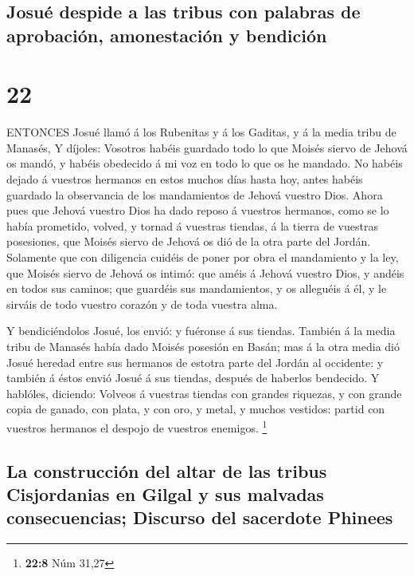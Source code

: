 \hypertarget{josuuxe9-despide-a-las-tribus-con-palabras-de-aprobaciuxf3n-amonestaciuxf3n-y-bendiciuxf3n}{%
\subsection{Josué despide a las tribus con palabras de aprobación,
amonestación y
bendición}\label{josuuxe9-despide-a-las-tribus-con-palabras-de-aprobaciuxf3n-amonestaciuxf3n-y-bendiciuxf3n}}

\hypertarget{section-21}{%
\section{22}\label{section-21}}

 ENTONCES Josué llamó á los Rubenitas y á los Gaditas, y á
la media tribu de Manasés,  Y díjoles: Vosotros habéis
guardado todo lo que Moisés siervo de Jehová os mandó, y habéis
obedecido á mi voz en todo lo que os he mandado.  No habéis
dejado á vuestros hermanos en estos muchos días hasta hoy, antes habéis
guardado la observancia de los mandamientos de Jehová vuestro Dios.
 Ahora pues que Jehová vuestro Dios ha dado reposo á
vuestros hermanos, como se lo había prometido, volved, y tornad á
vuestras tiendas, á la tierra de vuestras posesiones, que Moisés siervo
de Jehová os dió de la otra parte del Jordán.  Solamente que
con diligencia cuidéis de poner por obra el mandamiento y la ley, que
Moisés siervo de Jehová os intimó: que améis á Jehová vuestro Dios, y
andéis en todos sus caminos; que guardéis sus mandamientos, y os
alleguéis á él, y le sirváis de todo vuestro corazón y de toda vuestra
alma.

 Y bendiciéndolos Josué, los envió: y fuéronse á sus
tiendas.  También á la media tribu de Manasés había dado
Moisés posesión en Basán; mas á la otra media dió Josué heredad entre
sus hermanos de estotra parte del Jordán al occidente: y también á éstos
envió Josué á sus tiendas, después de haberlos bendecido.  Y
hablóles, diciendo: Volveos á vuestras tiendas con grandes riquezas, y
con grande copia de ganado, con plata, y con oro, y metal, y muchos
vestidos: partid con vuestros hermanos el despojo de vuestros enemigos.
\footnote{\textbf{22:8} Núm 31,27}

\hypertarget{la-construcciuxf3n-del-altar-de-las-tribus-cisjordanias-en-gilgal-y-sus-malvadas-consecuencias-discurso-del-sacerdote-phinees}{%
\subsection{La construcción del altar de las tribus Cisjordanias en
Gilgal y sus malvadas consecuencias; Discurso del sacerdote
Phinees}\label{la-construcciuxf3n-del-altar-de-las-tribus-cisjordanias-en-gilgal-y-sus-malvadas-consecuencias-discurso-del-sacerdote-phinees}}

